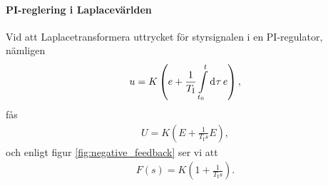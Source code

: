 \paragraph{PI-reglering i Laplacevärlden}
Vid att Laplacetransformera uttrycket för styrsignalen i en PI-regulator, nämligen
\begin{align*}
	u = K\left(e + \frac{1}{T_{\text{I}}}\int\limits_{t_{0}}^{t}\dd[]{\tau}e\right),
\end{align*}
fås
\begin{align*}
	U = K\left(E + \frac{1}{T_{\text{I}}s}E\right),
\end{align*}
och enligt figur \ref{fig:negative_feedback} ser vi att
\begin{align*}
	F(s) = K\left(1 + \frac{1}{T_{\text{I}}s}\right).
\end{align*}